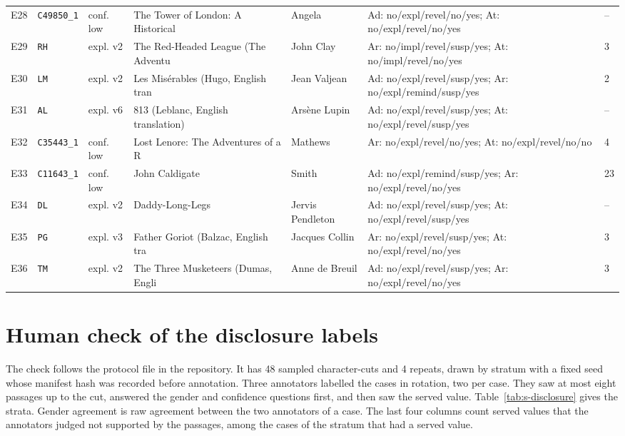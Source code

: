 \documentclass[11pt]{article}
\begin{document}
{\begin{longtable}{p{0.6cm}p{1.4cm}p{1.1cm}p{3.1cm}p{2.0cm}p{4.6cm}p{0.8cm}}
E28 & \texttt{C49850\_1} & conf. low & The Tower of London: A Historical  & Angela & Ad: no/expl/revel/no/yes; At: no/expl/revel/no/yes & -- \\
E29 & \texttt{RH} & expl. v2 & The Red-Headed League (The Adventu & John Clay & Ar: no/impl/revel/susp/yes; At: no/impl/revel/no/yes & 3 \\
E30 & \texttt{LM} & expl. v2 & Les Misérables (Hugo, English tran & Jean Valjean & Ad: no/expl/revel/susp/yes; Ar: no/expl/remind/susp/yes & 2 \\
E31 & \texttt{AL} & expl. v6 & 813 (Leblanc, English translation) & Arsène Lupin & Ad: no/expl/revel/susp/yes; At: no/expl/revel/susp/yes & -- \\
E32 & \texttt{C35443\_1} & conf. low & Lost Lenore: The Adventures of a R & Mathews & Ar: no/expl/revel/no/yes; At: no/expl/revel/no/no & 4 \\
E33 & \texttt{C11643\_1} & conf. low & John Caldigate & Smith & Ad: no/expl/remind/susp/yes; Ar: no/expl/revel/no/yes & 23 \\
E34 & \texttt{DL} & expl. v2 & Daddy-Long-Legs & Jervis Pendleton & Ad: no/expl/revel/susp/yes; At: no/expl/revel/susp/yes & -- \\
E35 & \texttt{PG} & expl. v3 & Father Goriot (Balzac, English tra & Jacques Collin & Ar: no/expl/revel/susp/yes; At: no/expl/revel/no/yes & 3 \\
E36 & \texttt{TM} & expl. v2 & The Three Musketeers (Dumas, Engli & Anne de Breuil & Ad: no/expl/revel/susp/yes; Ar: no/expl/revel/no/yes & 3 \\
\bottomrule\end{longtable}}

\section{Human check of the disclosure labels}
The check follows the protocol file in the repository. It has 48 sampled character-cuts and 4 repeats, drawn by stratum with a fixed seed whose manifest hash was recorded before annotation. Three annotators labelled the cases in rotation, two per case. They saw at most eight passages up to the cut, answered the gender and confidence questions first, and then saw the served value. Table~\ref{tab:s-disclosure} gives the strata. Gender agreement is raw agreement between the two annotators of a case. The last four columns count served values that the annotators judged not supported by the passages, among the cases of the stratum that had a served value.
\end{document}
